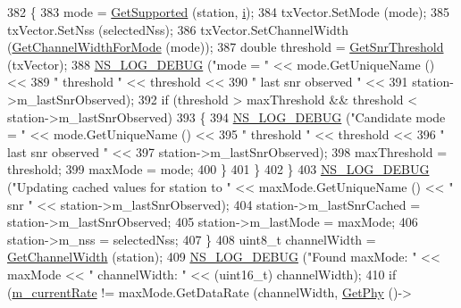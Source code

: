 \begin{DoxyCode}
382             \{
383               mode = \hyperlink{classns3_1_1WifiRemoteStationManager_a995c8bae0d84b168fd3e8bc9ecaacdd4}{GetSupported} (station, \hyperlink{bernuolliDistribution_8m_a6f6ccfcf58b31cb6412107d9d5281426}{i});
384               txVector.SetMode (mode);
385               txVector.SetNss (selectedNss);
386               txVector.SetChannelWidth (\hyperlink{classns3_1_1IdealWifiManager_a02a51cef1d20b348546c8dc21537e565}{GetChannelWidthForMode} (mode));
387               \textcolor{keywordtype}{double} threshold = \hyperlink{classns3_1_1IdealWifiManager_a4712a1357ab7ba3f2aba5b183cd18f6a}{GetSnrThreshold} (txVector);
388               \hyperlink{group__logging_ga413f1886406d49f59a6a0a89b77b4d0a}{NS\_LOG\_DEBUG} (\textcolor{stringliteral}{"mode = "} << mode.GetUniqueName () <<
389                             \textcolor{stringliteral}{" threshold "} << threshold  <<
390                             \textcolor{stringliteral}{" last snr observed "} <<
391                             station->m\_lastSnrObserved);
392               \textcolor{keywordflow}{if} (threshold > maxThreshold && threshold < station->m\_lastSnrObserved)
393                 \{
394                   \hyperlink{group__logging_ga413f1886406d49f59a6a0a89b77b4d0a}{NS\_LOG\_DEBUG} (\textcolor{stringliteral}{"Candidate mode = "} << mode.GetUniqueName () <<
395                                 \textcolor{stringliteral}{" threshold "} << threshold  <<
396                                 \textcolor{stringliteral}{" last snr observed "} <<
397                                 station->m\_lastSnrObserved);
398                   maxThreshold = threshold;
399                   maxMode = mode;
400                 \}
401             \}
402         \}
403       \hyperlink{group__logging_ga413f1886406d49f59a6a0a89b77b4d0a}{NS\_LOG\_DEBUG} (\textcolor{stringliteral}{"Updating cached values for station to "} <<  maxMode.GetUniqueName () << \textcolor{stringliteral}{"
       snr "} << station->m\_lastSnrObserved);
404       station->m\_lastSnrCached = station->m\_lastSnrObserved;
405       station->m\_lastMode = maxMode;
406       station->m\_nss = selectedNss;
407     \}
408   uint8\_t channelWidth = \hyperlink{classns3_1_1WifiRemoteStationManager_a918213c5b9fa629c4986f6d90521bbd4}{GetChannelWidth} (station);
409   \hyperlink{group__logging_ga413f1886406d49f59a6a0a89b77b4d0a}{NS\_LOG\_DEBUG} (\textcolor{stringliteral}{"Found maxMode: "} << maxMode << \textcolor{stringliteral}{" channelWidth: "} << (uint16\_t) channelWidth);
410   \textcolor{keywordflow}{if} (\hyperlink{classns3_1_1IdealWifiManager_ace233bd5a507e354ee1eac6c77b3944b}{m\_currentRate} != maxMode.GetDataRate (channelWidth, \hyperlink{classns3_1_1WifiRemoteStationManager_ab92b49cf78e0b72a51f5d13a1f15e242}{GetPhy} ()->

\end{DoxyCode}
